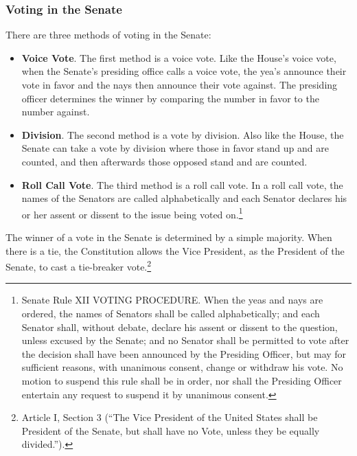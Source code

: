 \subsubsection{Voting in the Senate}

There are three methods of voting in the Senate:

\begin{itemize}
\item \textbf{Voice Vote}.  The first method is a voice vote.  Like the House's voice vote, when the Senate's presiding office calls a voice vote, the yea's announce their vote in favor and the nays then announce their vote against.  The presiding officer determines the winner by comparing the number in favor to the number against. 
\item \textbf{Division}.  The second method is a vote by division.  Also like the House, the Senate can take a vote by division where those in favor stand up and are counted, and then afterwards those opposed stand and are counted.
\item \textbf{Roll Call Vote}.  The third method is a roll call vote.  In a roll call vote, the names of the Senators are called alphabetically and each Senator declares his or her assent or dissent to the issue being voted on.\footnote{Senate Rule XII VOTING PROCEDURE. When the yeas and nays are ordered, the names of Senators shall be called alphabetically; and each Senator shall, without debate, declare his assent or dissent to the question, unless excused by the Senate; and no Senator shall be permitted to vote after the decision shall have been announced by the Presiding Officer, but may for sufficient reasons, with unanimous consent, change or withdraw his vote. No motion to suspend this rule shall be in order, nor shall the Presiding Officer entertain any request to suspend it by unanimous consent.}
\end{itemize}

The winner of a vote in the Senate is determined by a simple majority.  When there is a tie, the Constitution allows the Vice President, as the President of the Senate, to cast a tie-breaker vote.\footnote{Article I, Section 3 (``The Vice President of the United States shall be President of the Senate, but shall have no Vote, unless they be equally divided.'').}

